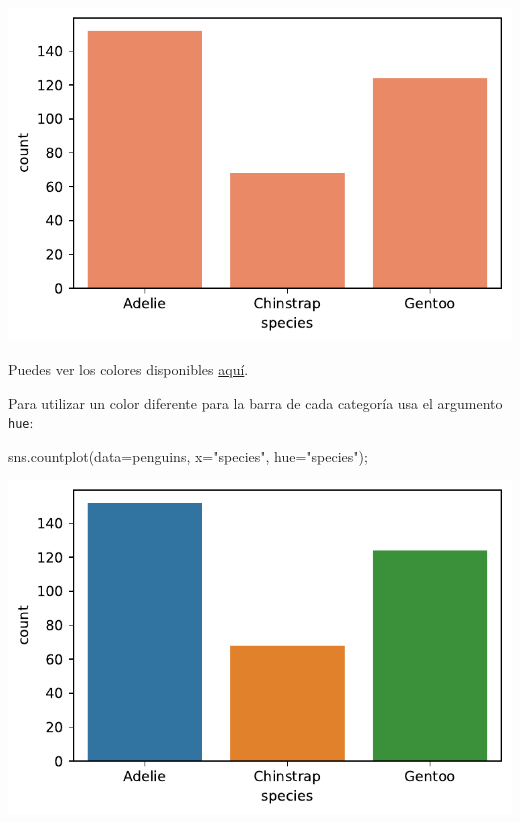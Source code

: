 \documentclass[
  a4paper,
  noprof,
  12pt,
  notoc,
  nosols,
  nobib]{mnye}
\newenvironment{Shaded}{\begin{snugshade}}{\end{snugshade}}
\newcommand{\NormalTok}[1]{\textcolor[rgb]{0.00,0.23,0.31}{#1}}
\newcommand{\OperatorTok}[1]{\textcolor[rgb]{0.37,0.37,0.37}{#1}}
\newcommand{\StringTok}[1]{\textcolor[rgb]{0.13,0.47,0.30}{#1}}
\theoremstyle{definition}
\theoremstyle{remark}
\begin{document}
\includegraphics{chapters/1categorical_files/figure-pdf/cell-8-output-1.pdf}

Puedes ver los colores disponibles
\href{https://matplotlib.org/stable/tutorials/colors/colors.html}{aquí}.

Para utilizar un color diferente para la barra de cada categoría usa el
argumento \texttt{hue}:

\begin{Shaded}
\begin{Highlighting}[]
\NormalTok{sns.countplot(data}\OperatorTok{=}\NormalTok{penguins, x}\OperatorTok{=}\StringTok{"species"}\NormalTok{, hue}\OperatorTok{=}\StringTok{"species"}\NormalTok{)}\OperatorTok{;}
\end{Highlighting}
\end{Shaded}

\includegraphics{chapters/1categorical_files/figure-pdf/cell-9-output-1.pdf}
\end{document}
